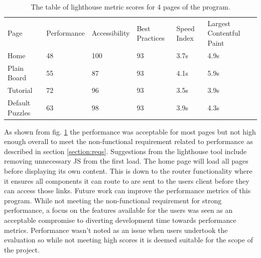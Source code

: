 \documentclass{l4proj}
\begin{document}
\begin{table}[]
    \caption{The table of lighthouse metric scores for 4 pages of the program.}\label{tab:lighthouse}
    \begin{tabular}{llllll}
        Page            & Performance & Accessibility & Best Practices & Speed Index & Largest Contentful Paint \\
        Home            & 48          & 100           & 93             & 3.7s        & 4.9s                     \\
        Plain Board     & 55          & 87            & 93             & 4.1s        & 5.9s                     \\
        Tutorial        & 72          & 96            & 93             & 3.5s        & 3.9s                     \\
        Default Puzzles & 63          & 98            & 93             & 3.9s        & 4.3s                    
    \end{tabular}
\end{table}

As shown from fig. \ref{tab:lighthouse} the performance was acceptable for most pages but not high enough overall to meet the non-functional requirement related to performance as described in section \ref{section:reqs}. Suggestions from the lighthouse tool include removing unnecessary JS from the first load. The home page will load all pages before displaying its own content. This is down to the router functionality where it ensures all components it can route to are sent to the users client before they can access those links. Future work can improve the performance metrics of this program. While not meeting the non-functional requirement for strong performance, a focus on the features available for the users was seen as an acceptable compromise to diverting development time towards performance metrics. Performance wasn't noted as an issue when users undertook the evaluation so while not meeting high scores it is deemed suitable for the scope of the project. 

\end{document}
